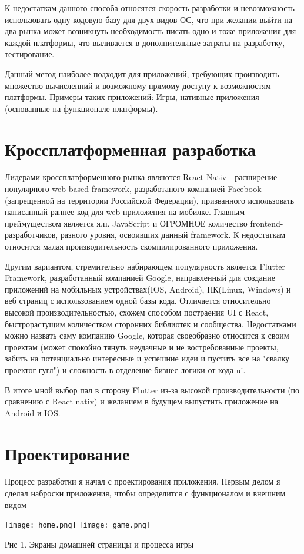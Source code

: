 \documentclass[14pt, oneside]{altsu-report}
\begin{document}
К недостаткам данного способа относятся скорость разработки и невозможность использовать одну кодовую базу для двух видов ОС, что при желании выйти на два рынка может возникнуть необходимость писать одно и тоже приложения для каждой платформы, что выливается в дополнительные затраты на разработку, тестирование.

Данный метод наиболее подходит для приложений, требующих производить множество вычисленний и возможному прямому доступу к возможностям платформы. Примеры таких приложений: Игры, нативные приложения (основанные на функционале платформы).

\section*{Кроссплатформенная разработка}
Лидерами кроссплатформенного рынка являются React Nativ - расширение популярного web-based framework, разработаного компанией Facebook (запрещенной на территории Российской Федерации), призванного использовать написанный раннее код для web-приложения на мобилке. Главным преймуществом является я.п. JavaScript и ОГРОМНОЕ количество frontend-разработчиков, разного уровня, освоивших данный framework. К недостаткам относится малая производительность скомпилированного приложения. 

Другим вариантом, стремительно набирающем популярность является Flutter Framework, разработанный компанией Google, направленный для создание приложений на мобильных устройствах(IOS, Android), ПК(Linux, Windows) и веб страниц с использованием одной базы кода. Отличается относительно высокой производительностью, схожем способом постраения UI с React, быстрорастущим количеством сторонних библиотек и сообщества. Недостатками можно назвать саму компанию Google, которая своеобразно относится к своим проектам (может спокойно тянуть неудачные и не востребованные проекты, забить на потенциально интересные и успешние идеи и пустить все на "свалку проектог гугл") и сложность в отделение бизнес логики от кода ui.

В итоге мной выбор пал в сторону Flutter из-за высокой производительности (по сравнению с React nativ) и желанием в будущем выпустить приложение на Android и IOS.
\section{Проектирование}
Процесс разработки я начал с проектирования приложения. Первым делом я сделал наброски приложения, чтобы определится с функционалом и внешним видом\\
\begin{center}
\texttt{[image: home.png]}
\hspace{10pt}
\texttt{[image: game.png]}

   Рис 1. Экраны домашней страницы и процесса игры
\end{center}
\end{document}

